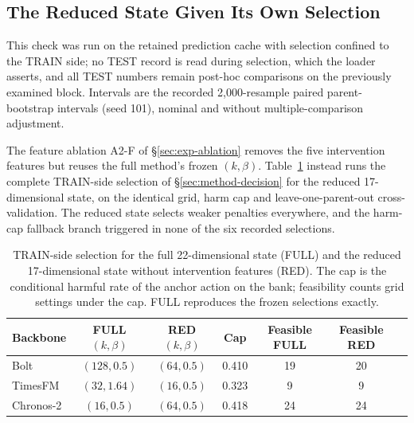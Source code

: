 \documentclass{article}
\begin{document}
\subsection{The Reduced State Given Its Own Selection}
\label{app:compact-selection}
This check was run on the retained prediction cache with selection confined to the TRAIN
side; no TEST record is read during selection, which the loader asserts, and all TEST
numbers remain post-hoc comparisons on the previously examined block. Intervals are the
recorded 2,000-resample paired parent-bootstrap intervals (seed 101), nominal and without
multiple-comparison adjustment.

The feature ablation A2-F of \S\ref{sec:exp-ablation} removes the five intervention features
but reuses the full method's frozen $(k,\beta)$. Table~\ref{tab:v53-selection} instead runs
the complete TRAIN-side selection of \S\ref{sec:method-decision} for the reduced
17-dimensional state, on the identical grid, harm cap and leave-one-parent-out
cross-validation. The reduced state selects weaker penalties everywhere, and the harm-cap
fallback branch triggered in none of the six recorded selections.

\begin{table}[htbp]
\centering\small
\caption{TRAIN-side selection for the full 22-dimensional state (FULL) and the reduced
17-dimensional state without intervention features (RED). The cap is the conditional
harmful rate of the anchor action on the bank; feasibility counts grid settings under the
cap. FULL reproduces the frozen selections exactly.}
\label{tab:v53-selection}
\begin{tabular}{lcccccc}
\toprule
Backbone & FULL $(k,\beta)$ & RED $(k,\beta)$ & Cap & Feasible FULL & Feasible RED \\
\midrule
Bolt & $(128, 0.5)$ & $(64, 0.5)$ & 0.410 & 19 & 20 \\
TimesFM & $(32, 1.64)$ & $(16, 0.5)$ & 0.323 & 9 & 9 \\
Chronos-2 & $(16, 0.5)$ & $(64, 0.5)$ & 0.418 & 24 & 24 \\
\bottomrule
\end{tabular}
\end{table}
\end{document}
